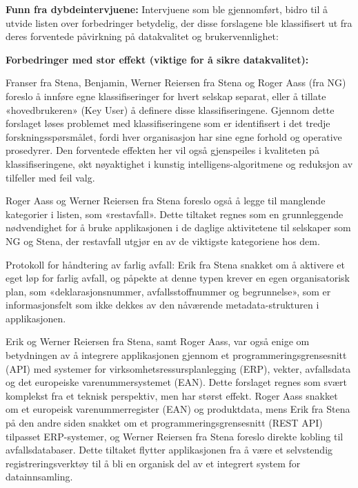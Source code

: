 \newline

\textbf{Funn fra dybdeintervjuene: } 
Intervjuene som ble gjennomført, bidro til å utvide listen over forbedringer betydelig, der disse forslagene ble klassifisert ut fra deres forventede påvirkning på datakvalitet og brukervennlighet:

\textbf{Forbedringer med stor effekt (viktige for å sikre datakvalitet):}

Franser fra Stena, Benjamin, Werner Reiersen fra Stena og Roger Aass (fra NG) foreslo å innføre egne klassifiseringer for hvert selskap separat, eller å tillate «hovedbrukeren» (Key User) å definere disse klassifiseringene. Gjennom dette forslaget løses problemet med klassifiseringene som er identifisert i det tredje forskningsspørsmålet, fordi hver organisasjon har sine egne forhold og operative prosedyrer. Den forventede effekten her vil også gjenspeiles i kvaliteten på klassifiseringene, økt nøyaktighet i kunstig intelligens-algoritmene og reduksjon av tilfeller med feil valg.

Roger Aass og Werner Reiersen fra Stena foreslo også å legge til manglende kategorier i listen, som «restavfall». Dette tiltaket regnes som en grunnleggende nødvendighet for å bruke applikasjonen i de daglige aktivitetene til selskaper som NG og Stena, der restavfall utgjør en av de viktigste kategoriene hos dem.

Protokoll for håndtering av farlig avfall: Erik fra Stena snakket om å aktivere et eget løp for farlig avfall, og påpekte at denne typen krever en egen organisatorisk plan, som «deklarasjonsnummer, avfallsstoffnummer og begrunnelse», som er informasjonsfelt som ikke dekkes av den nåværende metadata-strukturen i applikasjonen.

Erik og Werner Reiersen fra Stena, samt Roger Aass, var også enige om betydningen av å integrere applikasjonen gjennom et programmeringsgrensesnitt (API) med systemer for virksomhetsressursplanlegging (ERP), vekter, avfallsdata og det europeiske varenummersystemet (EAN). Dette forslaget regnes som svært komplekst fra et teknisk perspektiv, men har størst effekt. Roger Aass snakket om et europeisk varenummerregister (EAN) og produktdata, mens Erik fra Stena på den andre siden snakket om et programmeringsgrensesnitt (REST API) tilpasset ERP-systemer, og Werner Reiersen fra Stena foreslo direkte kobling til avfallsdatabaser. Dette tiltaket flytter applikasjonen fra å være et selvstendig registreringsverktøy til å bli en organisk del av et integrert system for datainnsamling.

